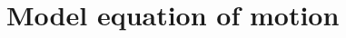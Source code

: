 \documentclass{jfm}
\begin{document}
%
%
%





\vspace{-.4 cm}


\section{Model equation of motion}




\end{document}

